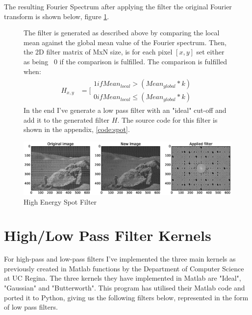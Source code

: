 The resulting Fourier Spectrum after applying the filter the original Fourier
transform is shown below, figure \ref{fig:fltr_spot}.

\begin{figure}[h]
\begin{minipage}{0.57\linewidth}
The filter is generated as described above by comparing the local mean against
the global mean value of the Fourier spectrum. Then, the 2D filter matrix of
MxN size, is for each pixel $[x,y]$ set either as being  $0$ if the comparison
is fulfilled. The comparison is fulfilled when:
\begin{align}
	H_{x,y} &= [\substack{1 if Mean_{local} > (Mean_{global} * k)\\
											 0 if Mean_{local} \le (Mean_{global} * k)}
\end{align}
In the end I've generate a low pass filter with an "ideal" cut-off and add it to
the generated filter $H$.  The source code for this filter is shown in the 
appendix, \ref{code:spot}.
\end{minipage}\hfill
\begin{minipage}{0.4\linewidth}
	\centering
	\includegraphics[width=1\linewidth,clip,trim={650 110 75 110}]{pics/moon_fltr_spot}
	\caption{High Energy Spot Filter}
	\label{fig:fltr_spot}
\end{minipage}
\end{figure}







\section{High/Low Pass Filter Kernels}
For high-pass and low-pass filters I've implemented the three main kernels as
previously created in Matlab functions by the Department of Computer Science at
UC Regina\cite{ucr_dftuv,ucr_lpfilter,ucr_hpfilter}. The three kernels they have
implemented in Matlab are "Ideal", "Gaussian" and "Butterworth".  This program
has utilised their Matlab code and ported it to Python\cite{git}, giving us the
following filters below, represented in the form of low pass filters.

